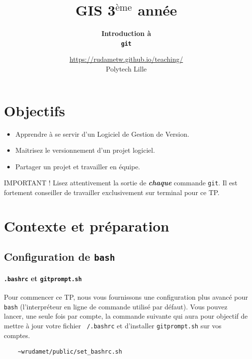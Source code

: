 \documentclass[final, a4paper, openbib, ]{article}
\title{GIS 3$^{\mbox{\`eme}}$ année
}
\author{\huge \textbf{Introduction à} \\  \Huge\textbf{\texttt{git}}}
\date{\Large \url{https://rudametw.github.io/teaching/} \\ Polytech Lille}
\begin{document}
\vspace{-4.5cm}
\posttitle{\par\end{center}}
\setlength{\droptitle}{-45pt}
\maketitle

\section{Objectifs}\label{objectifs}

\begin{itemize}
\item Apprendre à se servir d'un Logiciel de Gestion de Version.
\item Maitrisez le versionnement d'un projet logiciel.
\item Partager un projet et travailler en équipe.
\end{itemize}

\begin{alertinfo}{IMPORTANT !}
Lisez attentivement la sortie de \textbf{\textit{chaque}} commande \texttt{git}.
Il est fortement conseiller de travailler exclusivement sur terminal pour ce TP.
\end{alertinfo}

\section{Contexte et préparation } 

\subsection{Configuration de \texttt{bash}}

\paragraph{\texttt{.bashrc} et \texttt{gitprompt.sh}}
Pour commencer ce TP, nous vous fournissons une configuration plus avancé pour \texttt{bash} (l'interpréteur en ligne de commande utilisé par défaut).
Vous pouvez lancer, une seule fois par compte, la commande suivante qui aura pour objectif de mettre à jour votre fichier \texttt{~/.bashrc} et d'installer \texttt{gitprompt.sh} sur vos comptes.
\begin{verbatim}
	~wrudamet/public/set_bashrc.sh
\end{verbatim}
\end{document}
